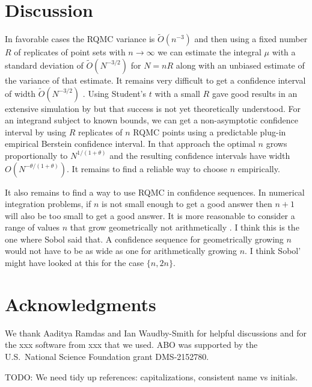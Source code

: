 \documentclass{article}
\newcommand{\art}[1]{\begingroup\color{blue}#1\endgroup}
\begin{document}
\section{Discussion}\label{sec:discussion}



In favorable cases
the RQMC variance is $\tilde O(n^{-3})$ and then
using a fixed number $R$ of replicates of
point sets with $n\to\infty$ we can estimate
the integral $\mu$ with a standard deviation 
of $\tilde O(N^{-3/2})$ for $N=nR$ along with
an unbiased estimate of the variance of that estimate.
It remains very difficult to get a confidence 
interval of width $\tilde O(N^{-3/2})$ \cite{err4qmc}.
Using Student's $t$ with a small $R$ gave good
results in an extensive simulation by \cite{LEcEtal24a}
but that success is not yet theoretically understood.
For an integrand subject to known bounds, we can get
a non-asymptotic confidence interval by using $R$
replicates of $n$ RQMC points using a
predictable plug-in empirical Berstein confidence
interval.  In that approach the optimal $n$
grows proportionally to $N^{1/(1+\theta)}$ and
the resulting confidence intervals have width
$O(N^{-\theta/(1+\theta)})$.
It remains to find a reliable way to choose $n$
empirically. 

It also remains to find a way to
use RQMC in confidence sequences.  In numerical
integration problems, if $n$ is not small enough
to get a good answer then $n+1$ will also be
too small to get a good answer. It is more reasonable
to consider a range of values $n$ that grow geometrically
not arithmetically \cite{sobo:1998}. \art{I think this is the one where Sobol said that.}  A confidence sequence for geometrically
growing $n$ would not have to be as wide as one for arithmetically
growing $n$.  \art{I think Sobol' might have looked at this
for the case $\{n,2n\}$.}



\section*{Acknowledgments}

We thank Aaditya Ramdas and Ian Waudby-Smith for helpful
discussions and for the \art{xxx} software
from \art{xxx} that we used.
ABO was supported by the U.S.\ National Science Foundation
grant DMS-2152780.

\art{TODO: We need tidy up references: capitalizations,
consistent name vs initials.}


\end{document}
